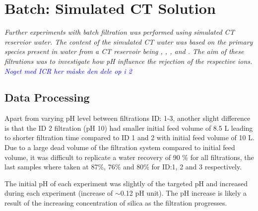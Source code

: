 \chapter{Batch: Simulated CT Solution}

\textit{Further experiments with batch filtration was performed using simulated CT reservior water. The content of the simulated CT water was based on the primary species present in water from a CT reservoir being ,  , ,  and .
The aim of these filtrations was to investigate how pH influence the rejection of the respective ions. 
\textcolor{blue}{Noget med ICR her måske den dele op i 2}
}




\section{Data Processing }

Apart from varying pH level between filtrations ID: 1-3, another slight difference is that the ID 2 filtration (pH 10) had smaller initial feed volume of 8.5 L leading to shorter filtration time compared to ID 1 and 2 with initial feed volume of 10 L.
Due to a large dead volume of the filtration system compared to initial feed volume, it was difficult to replicate a water recovery of 90 \% for all filtrations, the last samples where taken at 87\%, 76\% and  80\% for ID:1, 2 and 3 respectively. 

The initial pH of each experiment was slightly of the targeted pH and increased during each experiment (increase of $\sim$0.12 pH unit).
The pH increase is likely a result of the increasing concentration of silica as the filtration progresses.

